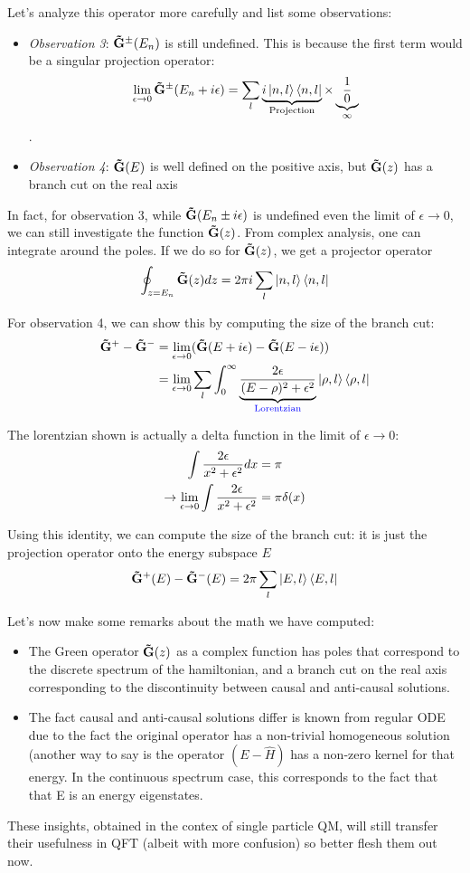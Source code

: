 \documentclass[11pt]{article}
\theoremstyle{definition}
\begin{document}
Let's analyze this operator more carefully and list some observations:
\begin{itemize}
\item \emph{Observation 3}: $\mathbf{\tilde{G}}^\pm(E_n)$ is still undefined.  This is because the first term would be a singular projection operator:
$$\lim_{\epsilon \rightarrow 0}\mathbf{\tilde{G}}^\pm(E_n + i \epsilon) = \sum_l \underbrace{{i \ket{n, l} \bra{n, l}}}_{\text{Projection}} \times \underbrace{{1 \over 0}}_{\infty}$$.
\item \emph{Observation 4}: $\mathbf{\tilde{G}}(E)$ is well defined on the positive axis, but $\mathbf{\tilde{G}}(z)$ has a branch cut on the real axis
\end{itemize}

In fact, for observation 3, while $\mathbf{\tilde{G}}(E_n \pm i \epsilon)$ is undefined even the limit of $\epsilon \rightarrow 0$, we can still investigate the function $\mathbf{\tilde{G}}(z)$.  From complex analysis, one can integrate around the poles.  If we do so for $\mathbf{\tilde{G}}(z)$, we get a projector operator
$$\oint_{z = E_n} \mathbf{\tilde{G}}(z) {dz} =  2 \pi i \sum_{l} \ket{n, l} \bra{n, l}$$

For observation 4, we can show this by computing the size of the branch cut:
\begin{align}
\mathbf{\tilde{G}}^+ - \mathbf{\tilde{G}}^- &= \lim_{\epsilon \rightarrow 0} (\mathbf{\tilde{G}}(E + i \epsilon) - \mathbf{\tilde{G}}(E- i \epsilon)) \\
& = \lim_{\epsilon \rightarrow 0}\sum_l \int_0^\infty \underbrace{2 \epsilon \over (E - \rho)^2 + \epsilon^2}_{\text{\color{blue} Lorentzian}} \ket{\rho, l} \bra{\rho, l}
\end{align}

The lorentzian shown is actually a delta function in the limit of $\epsilon \rightarrow 0$:
\begin{align}
 \int {2 \epsilon \over x^2 + \epsilon^2} dx & = \pi \\
\rightarrow  \lim_{\epsilon \rightarrow 0} \int {2 \epsilon \over x^2 + \epsilon^2} &= \pi \delta(x)
\end{align}

Using this identity, we can compute the size of the branch cut: it is just the projection operator onto the energy subspace $E$
\begin{align}
\mathbf{\tilde{G}}^+(E) - \mathbf{\tilde{G}}^-(E) = 2 \pi \sum_l \ket{E, l} \bra{E, l} 
\end{align}

Let's now make some remarks about the math we have computed:
\begin{itemize}
\item The Green operator $\mathbf{\tilde{G}}(z)$ as a complex function has poles that correspond to the discrete spectrum of the hamiltonian, and a branch cut on the real axis corresponding to the discontinuity between causal and anti-causal solutions.
\item The fact causal and anti-causal solutions differ is known from regular ODE due to the fact the original operator has a non-trivial homogeneous solution (another way to say is the operator $(E - \hat{H})$ has a non-zero kernel for that energy.  In the continuous spectrum case, this corresponds to the fact that that E is an energy eigenstates.
\end{itemize}

These insights, obtained in the contex of single particle QM, will still transfer their usefulness in QFT (albeit with more confusion) so better flesh them out now.
\end{document}
